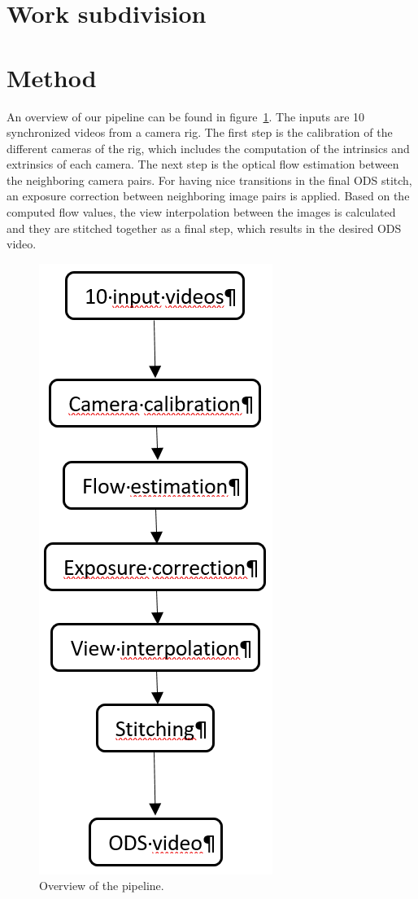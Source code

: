 \documentclass[10pt,twocolumn,letterpaper]{article}
\begin{document}
\section{Work subdivision}

\section{Method}
An overview of our pipeline can be found in figure~\ref{pipeline}. The inputs are 10 synchronized videos from a camera rig. The first step is the calibration of the different cameras of the rig, which includes the computation of the intrinsics and extrinsics of each camera. The next step is the optical flow estimation between the neighboring camera pairs. For having nice transitions in the final ODS stitch, an exposure correction between neighboring image pairs is applied. Based on the computed flow values, the view interpolation between the images is calculated and they are stitched together as a final step, which results in the desired ODS video.

\begin{figure}[t]
\begin{center}
   \includegraphics[width=0.3\linewidth]{pictures/pipeline.PNG}
\end{center}
   \caption{Overview of the pipeline.}
\label{pipeline}
\end{figure}
\end{document}

